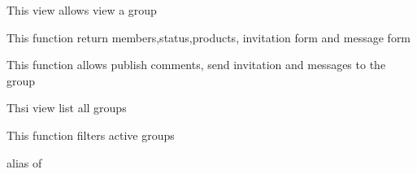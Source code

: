 \documentclass[letterpaper,10pt,english]{sphinxmanual}
\begin{document}
\begin{fulllineitems}
\label{modules/groups:apps.groups.views.GroupProfileView}
This view allows view a group

\begin{fulllineitems}
\label{modules/groups:apps.groups.views.GroupProfileView.get_context_data}
This function return members,status,products, invitation form and message form

\end{fulllineitems}


\begin{fulllineitems}
\label{modules/groups:apps.groups.views.GroupProfileView.post}
This function allows publish comments, send invitation and messages to the group

\end{fulllineitems}


\end{fulllineitems}


\begin{fulllineitems}
\label{modules/groups:apps.groups.views.GroupsView}
Thsi view list all groups

\begin{fulllineitems}
\label{modules/groups:apps.groups.views.GroupsView.get_queryset}
This function filters active groups

\end{fulllineitems}


\begin{fulllineitems}
\label{modules/groups:apps.groups.views.GroupsView.model}
alias of 

\end{fulllineitems}


\end{fulllineitems}
\end{document}
